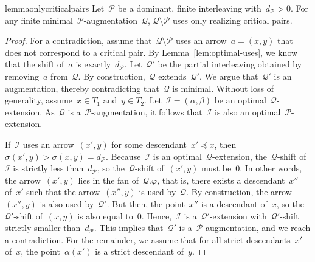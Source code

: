 \documentclass[a4paper,UKenglish, autoref, thm-restate, cleveref]{lipics-v2021}
\newcommand{\shift}[1]{\sigma_{#1}}
\newcommand{\resdist}[1]{d_{#1}}
\renewcommand{\phi}{\varphi}
\newcommand{\I}{\mathcal{I}}
\renewcommand{\P}{\mathcal{P}}
\newcommand{\Q}{\mathcal{Q}}
\begin{document}
\begin{restatable}{lemma}{onlycriticalpairs}
\label{lem:only-critical-pairs}
Let~$\P$ be a dominant, finite interleaving with~$\resdist{\P} > 0$.
For any finite minimal~$\P$-augmentation~$\Q$, $\Q \setminus \P$ uses only realizing critical pairs.
\end{restatable}
\begin{proof}
    For a contradiction, assume that~$\Q \setminus \P$ uses an arrow~$a = (x, y)$ that does not correspond to a critical pair.
    By Lemma~\ref{lem:optimal-uses}, we know that the shift of~$a$ is exactly~$\resdist{\P}$.
    Let~$\Q'$ be the partial interleaving obtained by removing~$a$ from~$\Q$.
    By construction,~$\Q$ extends~$\Q'$.
    We argue that~$\Q'$ is an augmentation, thereby contradicting that~$\Q$ is minimal.
    Without loss of generality, assume~$x \in T_1$ and~$y \in T_2$.    
    Let~$\I = (\alpha, \beta)$ be an optimal~$\Q$-extension.
    As~$\Q$ is a~$\P$-augmentation, it follows that~$\I$ is also an optimal~$\P$-extension.

    If~$\I$ uses an arrow~$(x', y)$ for some descendant~$x'\preceq x$, then~$\shift{}(x', y) > \shift{}(x, y) = \resdist{\P}$.
    Because~$\I$ is an optimal~$\Q$-extension, the~$\Q$-shift of~$\I$ is strictly less than~$\resdist{\P}$, so the~$\Q$-shift of~$(x', y)$ must be~$0$.
    In other words, the arrow~$(x', y)$ lies in the fan of~$\Q.\phi$, that is, there exists a descendant~$x''$ of~$x'$ such that the arrow~$(x'', y)$ is used by~$\Q$.
    By construction, the arrow~$(x'', y)$ is also used by~$\Q'$.
    But then, the point~$x''$ is a descendant of~$x$, so the~$\Q'$-shift of~$(x, y)$ is also equal to~$0$.
    Hence,~$\I$ is a~$\Q'$-extension with~$\Q'$-shift strictly smaller than~$\resdist{\P}$.
    This implies that~$\Q'$ is a~$\P$-augmentation, and we reach a contradiction.
    For the remainder, we assume that for all strict descendants~$x'$ of~$x$, the point~$\alpha(x')$ is a strict descendant of~$y$.


\end{proof}
\end{document}
